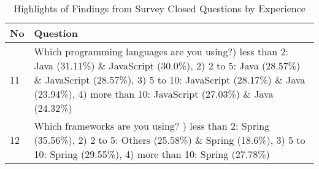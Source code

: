 \begin{table}[!ht]
    \centering
    \caption{Highlights of Findings from Survey Closed Questions by Experience}
    \begin{tabularx}{\textwidth}{v|k}
        \hline
        \textbf{No} & \textbf{Question}  \\ \hline
        
        11 & Which programming languages are you using?) less than 2: Java (31.11\%) \& JavaScript (30.0\%), 2) 2 to 5: Java (28.57\%) \& JavaScript (28.57\%), 3) 5 to 10: JavaScript (28.17\%) \& Java (23.94\%), 4) more than 10: JavaScript (27.03\%) \& Java (24.32\%)
        \\ \hline
        
        12 & Which frameworks are you using? ) less than 2: Spring (35.56\%), 2) 2 to 5: Others (25.58\%) \& Spring (18.6\%), 3) 5 to 10: Spring (29.55\%), 4) more than 10: Spring (27.78\%)
        \\ \hline
        

\end{tabularx}
\end{table}
